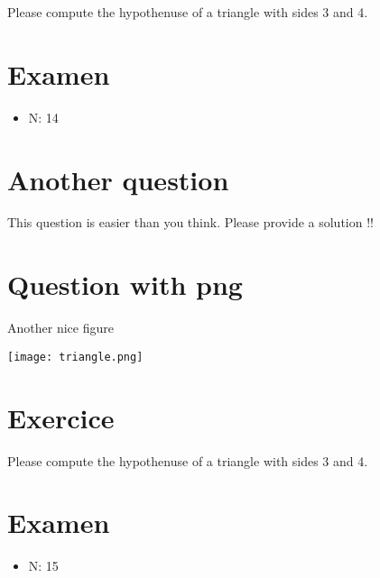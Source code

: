 \documentclass[a4paper,11pt,twoside]{article}
\begin{document}
Please compute the hypothenuse of a triangle with sides 3 and 4.



\subsection*{}
\label{sec:org60143a1}

\cleardoublepage

\section*{Examen}
\label{sec:org961460f}
\begin{itemize}
\item N: 14
\end{itemize}
\section*{Another question}
\label{sec:org236c61b}

This question is easier than you think. Please provide a solution !!



\section*{Question with png}
\label{sec:org8838370}

Another nice figure

\begin{center}
\texttt{[image: triangle.png]}
\end{center}



\section*{Exercice}
\label{sec:org1850b23}

Please compute the hypothenuse of a triangle with sides 3 and 4.



\subsection*{}
\label{sec:org0efce28}

\cleardoublepage

\section*{Examen}
\label{sec:orgebeacb8}
\begin{itemize}
\item N: 15
\end{itemize}
\end{document}
